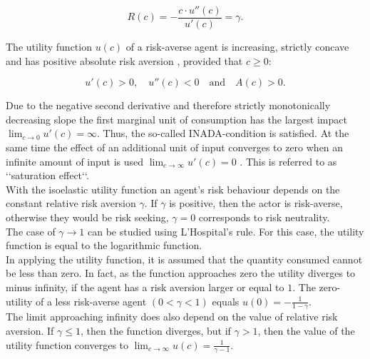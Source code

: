\bigskip

\begin{equation}
    R(c) = - \dfrac{c \cdot u''(c)}{u'(c)} = \gamma.
\end{equation}

\bigskip

\noindent The utility function $u(c)$ of a risk-averse agent is increasing, strictly concave and has positive absolute risk aversion \citep[p. 2]{poon2018finance}, provided that $c \geq 0$:

\begin{equation}\label{eq:ut.func.derivatives}
    u'(c) > 0, \quad u''(c) < 0 \quad \text{and} \quad A(c) > 0.
\end{equation}

\bigskip

\noindent Due to the negative second derivative and therefore strictly monotonically decreasing slope the first marginal unit of consumption has the largest impact $\lim_{c \to 0} u'(c) = \infty$. Thus, the so-called INADA-condition is satisfied. At the same time the effect of an additional unit of input converges to zero when an infinite amount of input is used $\lim_{c \to \infty} u'(c) = 0$ \citep[p. 20]{Uzawa1971sectormodel}. This is referred to as \lq\lq saturation effect\lq\lq. \label{INADA}\\

\noindent With the isoelastic utility function an agent's risk behaviour depends on the constant relative risk aversion $\gamma$. If $\gamma$ is positive, then the actor is risk-averse, otherwise they would be risk seeking, $\gamma = 0$ corresponds to risk neutrality.\\

\noindent The case of $\gamma \rightarrow 1$ can be studied using L'Hospital's rule. For this case, the utility function is equal to the logarithmic function.\\

\noindent In applying the utility function, it is assumed that the quantity consumed cannot be less than zero. In fact, as the function approaches zero the utility diverges to minus infinity, if the agent has a risk aversion larger or equal to $1$. The zero-utility of a less risk-averse agent $(0 < \gamma<1)$ equals $u(0) = -\frac{1}{1-\gamma}$. \\
The limit approaching infinity does also depend on the value of relative risk aversion. If $\gamma \leq 1$, then the function diverges, but if $\gamma > 1$, then the value of the utility function converges to 
$\lim_{c \to \infty} u(c) = \frac{1}{\gamma -1}$. \label{isoel.ut.f:limits}